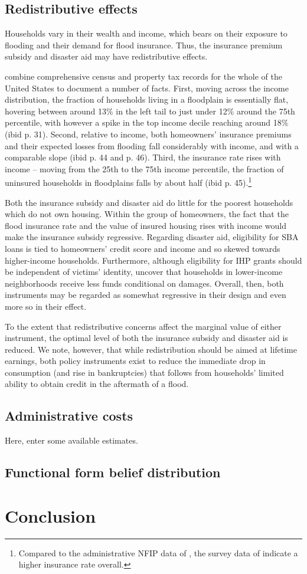 \documentclass[12pt]{article}
\begin{document}
\subsection{Redistributive effects}
Households vary in their wealth and income, which bears on their exposure to flooding and their demand for flood insurance. Thus, the insurance premium subsidy and disaster aid may  have redistributive effects.

\cite{qin2026flood} combine comprehensive census and property tax records for the whole of the United States to document a number of facts. First, moving across the income distribution, the fraction of households living in a floodplain is essentially flat, hovering between around 13$\%$ in the left tail to just under 12$\%$ around the 75th percentile, with however a spike in the top income decile reaching around 18$\%$ (ibid p. 31). Second, relative to income, both homeowners' insurance premiums and their expected losses from flooding fall considerably with income, and with a comparable slope (ibid p. 44 and p. 46). Third, the insurance rate rises with income -- moving from the 25th to the 75th income percentile, the fraction of uninsured households in floodplains falls by about half (ibid p. 45).\footnote{Compared to the administrative NFIP data of \cite{amornsiripanitch2025measuring}, the survey data of \cite{qin2026flood} indicate a higher insurance rate overall.} 

Both the insurance subsidy and disaster aid do little for the poorest households which do not own housing. Within the group of homeowners, the fact that the flood insurance rate and the value of insured housing rises with income would make the insurance subsidy regressive. Regarding disaster aid, eligibility for SBA loans is tied to homeowners' credit score and income and so skewed towards higher-income households. Furthermore, although eligibility for IHP grants should be independent of victims' identity, \cite{billings2022let} uncover that households in lower-income neighborhoods receive less funds conditional on damages. Overall, then, both instruments may be regarded as somewhat regressive in their design and even more so in their effect.

To the extent that redistributive concerns affect the marginal value of either instrument, the optimal level of both the insurance subsidy and disaster aid is reduced. We note, however, that while redistribution should be aimed at lifetime earnings, both policy instruments exist to reduce the immediate drop in consumption (and rise in bankruptcies) that follows from households' limited ability to obtain credit in the aftermath of a flood.  

\subsection{Administrative costs}\label{subsec:admincosts}

Here, enter some available estimates. 

\subsection{Functional form belief distribution}\label{subsec:functionalform}

\section{Conclusion}
\label{sec:conclusion}



\end{document}
